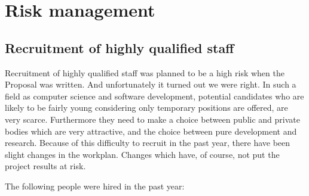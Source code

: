 \documentclass{deliverablereport}
\begin{document}
\section{Risk management}
\subsection{Recruitment of highly qualified staff}
 Recruitment of highly qualified staff was planned to be a high risk when the Proposal was written. And unfortunately it turned out we were right. In such a field as computer science and software development, potential candidates who are likely to be fairly young considering only temporary positions are offered, are very scarce. Furthermore they need to make a choice between public and private bodies which are very attractive, and the choice between pure development and research.
Because of this difficulty to recruit in the past year, there have been slight changes in the workplan. Changes which have, of course, not put the project results at risk.

The following people were hired in the past year:\\
\end{document}

